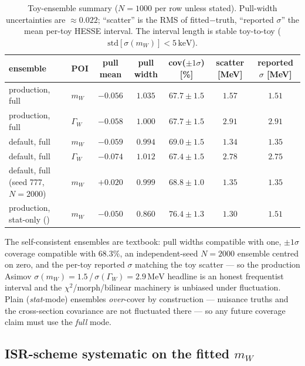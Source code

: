 \documentclass[11pt,a4paper]{article}
\newcommand{\code}[1]{\texttt{\detokenize{#1}}}
\newcommand{\mW}{m_W}
\newcommand{\GammaW}{\Gamma_W}
\newcommand{\MeV}{\ensuremath{\,\mathrm{MeV}}}
\begin{document}
\begin{table}[h]
\centering
\caption{Toy-ensemble summary ($N=1000$ per row unless stated).
Pull-width uncertainties are $\approx0.022$; ``scatter'' is the RMS of
fitted$-$truth, ``reported $\sigma$'' the mean per-toy HESSE interval.
The interval length is stable toy-to-toy
($\mathrm{std}[\sigma(\mW)]<5\,\text{keV}$).}
\label{tab:toys-coverage}
{\footnotesize\setlength{\tabcolsep}{4pt}%
\begin{tabular}{l l c c c c c}
\toprule
ensemble & POI & pull mean & pull width & cov($\pm1\sigma$) [\%] &
scatter [MeV] & reported $\sigma$ [MeV] \\
\midrule
production, full & $\mW$     & $-0.056$ & $1.035$ & $67.7\pm1.5$ & $1.57$ & $1.51$ \\
production, full & $\GammaW$ & $-0.058$ & $1.000$ & $67.7\pm1.5$ & $2.91$ & $2.91$ \\
default, full    & $\mW$     & $-0.059$ & $0.994$ & $69.0\pm1.5$ & $1.34$ & $1.35$ \\
default, full    & $\GammaW$ & $-0.074$ & $1.012$ & $67.4\pm1.5$ & $2.78$ & $2.75$ \\
default, full (seed 777, $N{=}2000$) & $\mW$ & $+0.020$ & $0.999$ & $68.8\pm1.0$ & $1.35$ & $1.35$ \\
production, stat-only (\code{--pseudo}) & $\mW$ & $-0.050$ & $0.860$ & $76.4\pm1.3$ & $1.30$ & $1.51$ \\
\bottomrule
\end{tabular}}
\end{table}

The self-consistent ensembles are textbook: pull widths compatible with
one, $\pm1\sigma$ coverage compatible with $68.3\%$, an independent-seed
$N=2000$ ensemble centred on zero, and the per-toy reported $\sigma$
matching the toy scatter --- so the production Asimov
$\sigma(\mW)=1.5$\,/\,$\sigma(\GammaW)=2.9\MeV$ headline is an honest
frequentist interval and the $\chi^2$/morph/bilinear machinery is
unbiased under fluctuation. Plain \code{--pseudo} (\emph{stat}-mode)
ensembles \emph{over}-cover by construction --- nuisance truths and the
cross-section covariance are not fluctuated there --- so any future
coverage claim must use the \emph{full} mode.

\subsection{ISR-scheme systematic on the fitted $m_W$}\label{sec:val-isr-cross}
\end{document}
